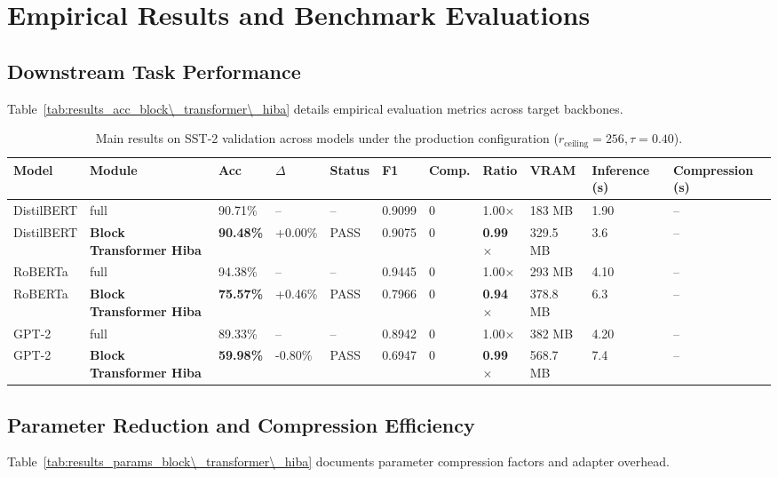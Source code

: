 \section{Empirical Results and Benchmark Evaluations}

\subsection{Downstream Task Performance}
Table~\ref{tab:results_acc_block\_transformer\_hiba} details empirical evaluation metrics across target backbones.

\begin{table}[t]
\centering
\small
\begin{tabular}{lllllllllll}
\toprule
\textbf{Model} & \textbf{Module} & \textbf{Acc} & \textbf{$\Delta$} & \textbf{Status} & \textbf{F1} & \textbf{Comp.} & \textbf{Ratio} & \textbf{VRAM} & \textbf{Inference (s)} & \textbf{Compression (s)} \\
\midrule
DistilBERT & full & 90.71\% & -- & -- & 0.9099 & 0 & 1.00$\times$ & 183 MB & 1.90 & -- \\
DistilBERT & \textbf{Block Transformer Hiba} & \textbf{90.48\%} & +0.00\% & PASS & 0.9075 & 0 & \textbf{0.99$\times$} & 329.5 MB & 3.6 & -- \\
RoBERTa & full & 94.38\% & -- & -- & 0.9445 & 0 & 1.00$\times$ & 293 MB & 4.10 & -- \\
RoBERTa & \textbf{Block Transformer Hiba} & \textbf{75.57\%} & +0.46\% & PASS & 0.7966 & 0 & \textbf{0.94$\times$} & 378.8 MB & 6.3 & -- \\
GPT-2 & full & 89.33\% & -- & -- & 0.8942 & 0 & 1.00$\times$ & 382 MB & 4.20 & -- \\
GPT-2 & \textbf{Block Transformer Hiba} & \textbf{59.98\%} & -0.80\% & PASS & 0.6947 & 0 & \textbf{0.99$\times$} & 568.7 MB & 7.4 & -- \\
\bottomrule
\end{tabular}
\caption{Main results on SST-2 validation across models under the production configuration ($r_{\mathrm{ceiling}}=256, \tau=0.40$).}
\label{tab:main_sst2}
\end{table}

\subsection{Parameter Reduction and Compression Efficiency}
Table~\ref{tab:results_params_block\_transformer\_hiba} documents parameter compression factors and adapter overhead.

